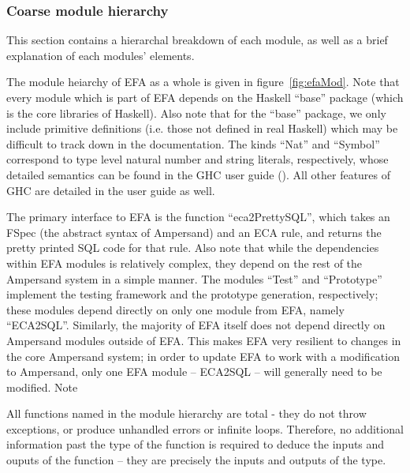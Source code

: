 \documentclass[12pt, svgnames]{article}
\let\Oldsubsubsection\subsubsection
\renewcommand{\subsubsection}{\FloatBarrier\Oldsubsubsection}
\begin{document}
\Oldsubsubsection{Coarse module hierarchy}

This section contains a hierarchal breakdown of each module, as well as a brief
explanation of each modules' elements. 

The module heiarchy of EFA as a whole is given in figure~\ref{fig:efaMod}. Note
that every module which is part of EFA depends on the
Haskell ``base'' package (which is the core libraries of Haskell). Also note
that for the ``base'' package, we only include primitive definitions (i.e. those
not defined in real Haskell) which may be difficult to track down in the
documentation. The kinds ``Nat'' and ``Symbol'' correspond to type level natural
number and string literals, respectively, whose detailed semantics can be found
in the GHC user guide (\cite{ghcUserGuide}). All other features of GHC are
detailed in the user guide as well.

The primary interface to EFA is the function ``eca2PrettySQL'', which takes an
FSpec (the abstract syntax of Ampersand) and an ECA rule, and returns the pretty
printed SQL code for that rule. Also note that while the dependencies within EFA
modules is relatively complex, they depend on the rest of the Ampersand system
in a simple manner. The modules ``Test'' and ``Prototype'' implement the testing
framework and the prototype generation, respectively; these modules depend
directly on only one module from EFA, namely ``ECA2SQL''. Similarly, the
majority of EFA itself does not depend directly on Ampersand modules outside of
EFA. This makes EFA very resilient to changes in the core Ampersand system; in
order to update EFA to work with a modification to Ampersand, only one EFA
module -- ECA2SQL -- will generally need to be modified. Note

All functions named in the module hierarchy are total - they do not throw
exceptions, or produce unhandled errors or infinite loops. Therefore, no
additional information past the type of the function is required to deduce the
inputs and ouputs of the function -- they are precisely the inputs and outputs
of the type.


\FloatBarrier
\end{document}

